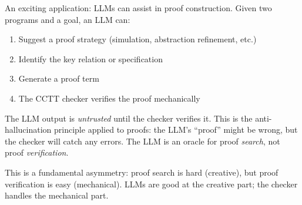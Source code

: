 An exciting application: LLMs can assist in proof construction.
Given two programs and a goal, an LLM can:

\begin{enumerate}
\item Suggest a proof strategy (simulation, abstraction refinement, etc.)
\item Identify the key relation or specification
\item Generate a proof term
\item The CCTT checker verifies the proof mechanically
\end{enumerate}

The LLM output is \emph{untrusted} until the checker verifies it.
This is the anti-hallucination principle applied to proofs:
the LLM's ``proof'' might be wrong, but the checker will catch
any errors.  The LLM is an oracle for proof \emph{search}, not
proof \emph{verification}.

\begin{remark}
This is a fundamental asymmetry: proof search is hard (creative),
but proof verification is easy (mechanical).  LLMs are good at
the creative part; the checker handles the mechanical part.
\end{remark}
